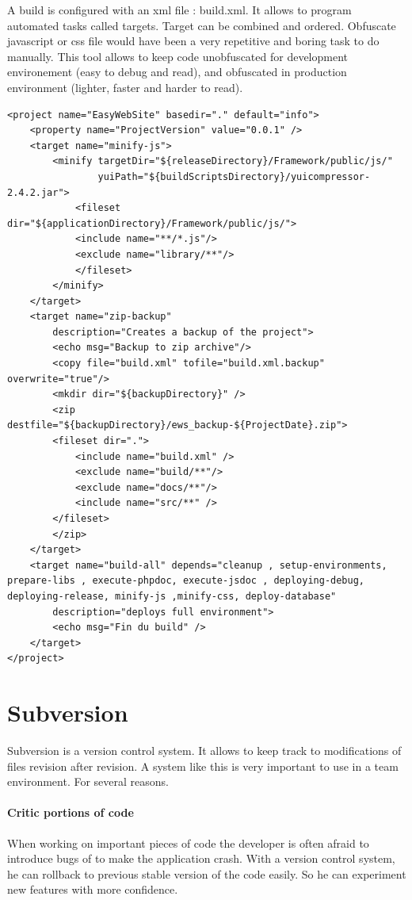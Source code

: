 A build is configured with an xml file : build.xml. It allows to program automated tasks called targets. Target can be combined and ordered.
Obfuscate javascript or css file would have been a very repetitive and boring task to do manually. This tool allows to keep code unobfuscated for development environement (easy to debug and read), and obfuscated in production environment (lighter, faster and harder to read).

\lstset{language=Ant}
\begin{lstlisting}[label=phing-build,caption=Example of Phing build.xml]
<project name="EasyWebSite" basedir="." default="info">
	<property name="ProjectVersion" value="0.0.1" />
	<target name="minify-js">
		<minify targetDir="${releaseDirectory}/Framework/public/js/"
				yuiPath="${buildScriptsDirectory}/yuicompressor-2.4.2.jar">
			<fileset dir="${applicationDirectory}/Framework/public/js/">
			<include name="**/*.js"/>
			<exclude name="library/**"/>
			</fileset>
		</minify>
	</target>	
	<target name="zip-backup"
		description="Creates a backup of the project">
		<echo msg="Backup to zip archive"/>
		<copy file="build.xml" tofile="build.xml.backup" overwrite="true"/>
		<mkdir dir="${backupDirectory}" />				
		<zip destfile="${backupDirectory}/ews_backup-${ProjectDate}.zip">
		<fileset dir=".">
			<include name="build.xml" />
			<exclude name="build/**"/>
			<exclude name="docs/**"/>
			<include name="src/**" />			
		</fileset>
		</zip>
	</target>
	<target name="build-all" depends="cleanup , setup-environments, prepare-libs , execute-phpdoc, execute-jsdoc , deploying-debug, deploying-release, minify-js ,minify-css, deploy-database"
		description="deploys full environment">       
		<echo msg="Fin du build" />		
	</target>		
</project>
\end{lstlisting}



\section{Subversion}

Subversion is a version control system. It allows to keep track to modifications of files revision after revision. A system like this is very important to use in a team environment. For several reasons.

\paragraph*{Critic portions of code}
When working on important pieces of code the developer is often afraid to introduce bugs of to make the application crash. With a version control system, he can rollback to previous stable version of the code easily. So he can experiment new features with more confidence. 

